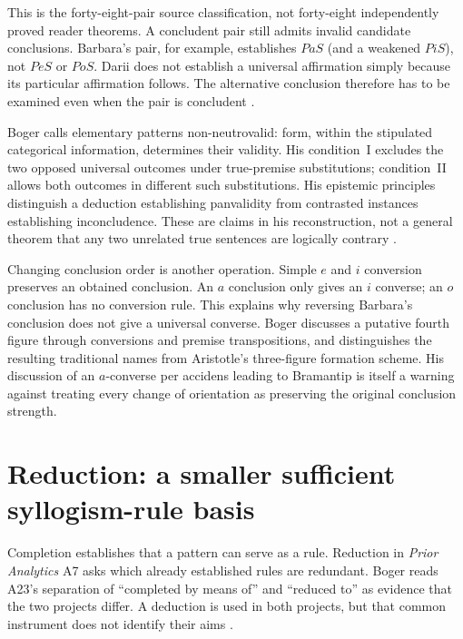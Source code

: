 This is the forty-eight-pair source classification, not forty-eight independently
proved reader theorems. A concludent pair still admits invalid candidate
conclusions. Barbara's pair, for example, establishes \(PaS\) (and a weakened
\(PiS\)), not \(PeS\) or \(PoS\). Darii does not establish a universal
affirmation simply because its particular affirmation follows. The alternative
conclusion therefore has to be examined even when the pair is concludent
\parencite[pp.~202--207]{Boger2004UnderlyingLogic}.

Boger calls elementary patterns non-neutrovalid: form, within the stipulated
categorical information, determines their validity. His condition~I excludes
the two opposed universal outcomes under true-premise substitutions; condition~II
allows both outcomes in different such substitutions. His epistemic principles
distinguish a deduction establishing panvalidity from contrasted instances
establishing inconcludence. These are claims in his reconstruction, not a
general theorem that any two unrelated true sentences are logically contrary
\parencite[pp.~191--202]{Boger2004UnderlyingLogic}.

Changing conclusion order is another operation. Simple \(e\) and \(i\)
conversion preserves an obtained conclusion. An \(a\) conclusion only gives
an \(i\) converse; an \(o\) conclusion has no conversion rule. This explains
why reversing Barbara's conclusion does not give a universal converse.
Boger discusses a putative fourth figure through conversions and premise
transpositions, and distinguishes the resulting traditional names from
Aristotle's three-figure formation scheme. His discussion of an \(a\)-converse
per accidens leading to Bramantip is itself a warning against treating every
change of orientation as preserving the original conclusion strength.

\section{Reduction: a smaller sufficient syllogism-rule basis}
\label{sec:p13-boger-reduction}

Completion establishes that a pattern can serve as a rule. Reduction in
\emph{Prior Analytics} A7 asks which already established rules are redundant.
Boger reads A23's separation of ``completed by means of'' and ``reduced to''
as evidence that the two projects differ. A deduction is used in both projects,
but that common instrument does not identify their aims
\parencite[pp.~207--214]{Boger2004UnderlyingLogic}.

